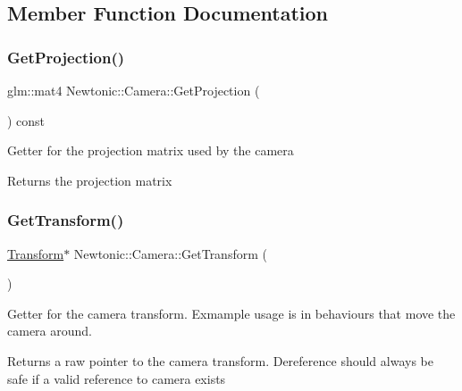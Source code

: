 \subsection{Member Function Documentation}
\mbox{\label{classNewtonic_1_1Camera_aca70d30ed6b037969c4b34ca2c7f5c85}} 
\subsubsection{\texorpdfstring{GetProjection()}{GetProjection()}}
{\footnotesize\ttfamily glm\+::mat4 Newtonic\+::\+Camera\+::\+Get\+Projection (\begin{DoxyParamCaption}{ }\end{DoxyParamCaption}) const}

Getter for the projection matrix used by the camera \begin{DoxyReturn}{Returns}
the projection matrix 
\end{DoxyReturn}
\mbox{\label{classNewtonic_1_1Camera_a8cbcc37c9d7a17902efa6061c6cba855}} 
\subsubsection{\texorpdfstring{GetTransform()}{GetTransform()}}
{\footnotesize\ttfamily \mbox{\hyperlink{classNewtonic_1_1Transform}{Transform}}$\ast$ Newtonic\+::\+Camera\+::\+Get\+Transform (\begin{DoxyParamCaption}{ }\end{DoxyParamCaption})\hspace{0.3cm}{\ttfamily [inline]}}

Getter for the camera transform. Exmample usage is in behaviours that move the camera around. \begin{DoxyReturn}{Returns}
a raw pointer to the camera transform. Dereference should always be safe if a valid reference to camera exists 
\end{DoxyReturn}
\mbox{\label{classNewtonic_1_1Camera_a82dc663bf6a6df7a043c766e35092b93}} 
